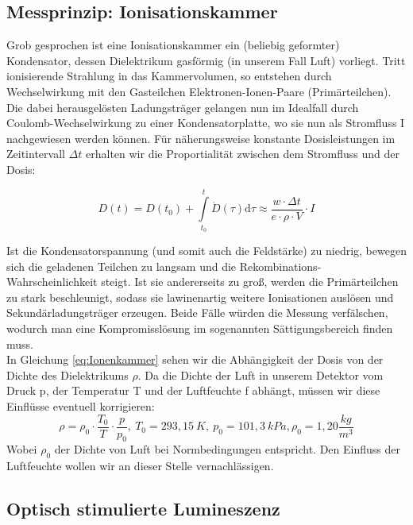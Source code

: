 \subsection{Messprinzip: Ionisationskammer}
Grob gesprochen ist eine Ionisationskammer ein (beliebig geformter) Kondensator, dessen Dielektrikum gasförmig (in unserem Fall Luft) vorliegt. Tritt ionisierende Strahlung in das Kammervolumen, so entstehen durch Wechselwirkung mit den Gasteilchen Elektronen-Ionen-Paare (Primärteilchen). Die dabei herausgelösten Ladungsträger gelangen nun im Idealfall durch Coulomb-Wechselwirkung zu einer Kondensatorplatte, wo sie nun als Stromfluss I nachgewiesen werden können. Für näherungsweise konstante Dosisleistungen im Zeitintervall $\Delta t$ erhalten wir die Proportialität zwischen dem Stromfluss und der Dosis:

\begin{equation} \label{eq:Ionenkammer}
	D(t) = D(t_0) + \int \limits_{t_0}^{t} \dot{D}(\tau) \mathrm{d}\tau \approx \frac{w \cdot \Delta t}{e \cdot \rho \cdot V} \cdot I
\end{equation}

Ist die Kondensatorspannung (und somit auch die Feldstärke) zu niedrig, bewegen sich die geladenen Teilchen zu langsam und die Rekombinations-Wahrscheinlichkeit steigt. Ist sie andererseits zu groß, werden die Primärteilchen zu stark beschleunigt, sodass sie lawinenartig weitere Ionisationen auslösen und Sekundärladungsträger erzeugen. Beide Fälle würden die Messung verfälschen, wodurch man eine Kompromisslösung im sogenannten Sättigungsbereich finden muss.\\ 

In Gleichung \ref{eq:Ionenkammer} sehen wir die Abhängigkeit der Dosis von der Dichte des Dielektrikums $\rho$. Da die Dichte der Luft in unserem Detektor vom Druck p, der Temperatur T und der Luftfeuchte f abhängt, müssen wir diese Einflüsse eventuell korrigieren:
\begin{equation}
	\rho = \rho_0 \cdot \frac{T_0}{T} \cdot \frac{p}{p_0} ,
	\ T_0 = 293,15\ K,\ p_0 = 101,3\ kPa, \rho_0 =1,20 \frac{kg}{m^3}
    \label{formel:kappa}
\end{equation}
Wobei $\rho_0$ der Dichte von Luft bei Normbedingungen entspricht. Den Einfluss der Luftfeuchte wollen wir an dieser Stelle vernachlässigen. \cite{PA_neu}


\subsection{Optisch stimulierte Lumineszenz}

